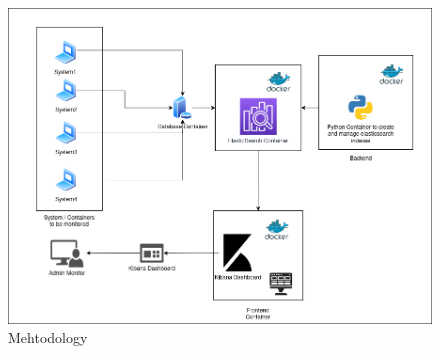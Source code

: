 \begin{figure}[ht!]
	\centering
    \includegraphics[scale=0.3]{assests/methodology.png}
	\caption{Mehtodology}
	\label{fig:world}
\end{figure}








